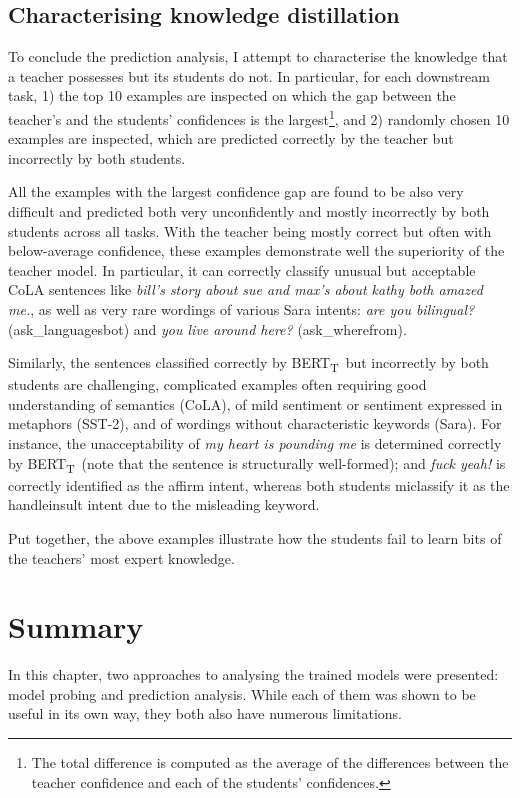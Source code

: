 \documentclass[bsc,frontabs,singlespacing,parskip,deptreport]{infthesis}
\def\BERTT{BERT\textsubscript{T}}
\begin{document}
{{    \subsection{Characterising knowledge distillation}{
      To conclude the prediction analysis, I attempt to characterise the knowledge that a teacher possesses but its students do not.
      In particular, for each downstream task, 1) the top 10 examples are inspected on which the gap between the teacher's and the students' confidences is the largest\footnote{The total difference is computed as the average of the differences between the teacher confidence and each of the students' confidences.}, and 2) randomly chosen 10 examples are inspected, which are predicted correctly by the teacher but incorrectly by both students.

      All the examples with the largest confidence gap are found to be also very difficult and predicted both very unconfidently and mostly incorrectly by both students across all tasks.
      With the teacher being mostly correct but often with below-average confidence, these examples demonstrate well the superiority of the teacher model. In particular, it can correctly classify unusual but acceptable CoLA sentences like \textit{bill's story about sue and max's about kathy both amazed me.}, as well as very rare wordings of various Sara intents: \textit{are you bilingual?} (ask\_languagesbot) and \textit{you live around here?} (ask\_wherefrom).

      Similarly, the sentences classified correctly by \BERTT~but incorrectly by both students are challenging, complicated examples often requiring good understanding of semantics (CoLA), of mild sentiment or sentiment expressed in metaphors (SST-2), and of wordings without characteristic keywords (Sara).
      For instance, the unacceptability of \textit{my heart is pounding me} is determined correctly by \BERTT~(note that the sentence is structurally well-formed); and \textit{fuck yeah!} is correctly identified as the affirm intent, whereas both students miclassify it as the handleinsult intent due to the misleading keyword.

      Put together, the above examples illustrate how the students fail to learn bits of the teachers' most expert knowledge.
    }
  }

  \section{Summary}{
    In this chapter, two approaches to analysing the trained models were presented: model probing and prediction analysis.
    While each of them was shown to be useful in its own way, they both also have numerous limitations.

}}
\end{document}
